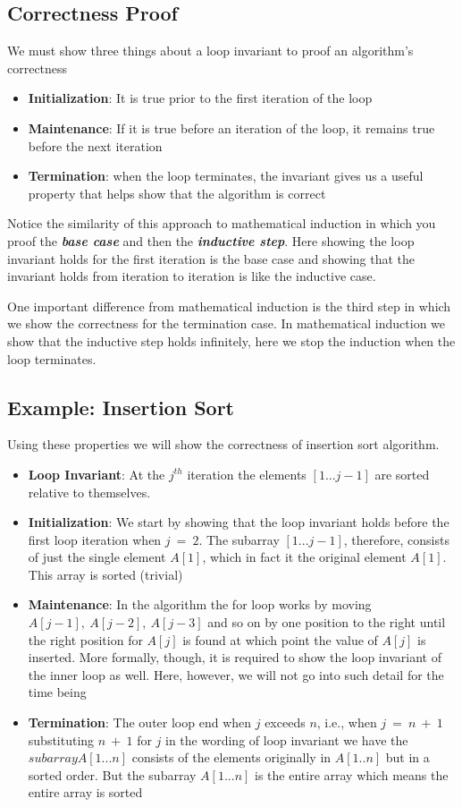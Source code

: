 \documentclass[12pt,a4paper]{book}
\begin{document}
\subsection{Correctness Proof}
We must show three things about a loop invariant to proof an algorithm’s correctness
\begin{itemize}
\item \textbf{Initialization}: It is true prior to the first iteration of the loop
\item \textbf{Maintenance}: If it is true before an iteration of the loop, it remains true before the next
iteration
\item \textbf{Termination}: when the loop terminates, the invariant gives us a useful property that
helps show that the algorithm is correct
\end{itemize}
\par Notice the similarity of this approach to mathematical induction in which you proof the \textit{\textbf{base case}} and then the \textbf{\textit{inductive step}}. Here showing the loop invariant holds for the first iteration is the base case and showing that the invariant holds from iteration to iteration is like the inductive case.
\par One important difference from mathematical induction is the third step in which we show the correctness for the termination case. In mathematical induction we show that the inductive step holds infinitely, here we stop the induction when the loop terminates.
\subsection{Example: Insertion Sort}

Using these properties we will show the correctness of insertion sort algorithm.
\begin{itemize}
\item \textbf{Loop Invariant}: At the $j^{th}$ iteration the elements $[1...j-1]$ are sorted relative to themselves.
\item \textbf{Initialization}: 
We start by showing that the loop invariant holds before the first loop iteration when $j\ =\ 2$. The subarray $[1 ... j-1]$, therefore, consists of just the single element $A[1]$, which in fact it the original element $A[1]$.  This array is sorted (trivial)
\item \textbf{Maintenance}:
In the algorithm the for loop works by moving $A[j-1],\ A[j-2],\ A[j-3]$ and so on by one position to the right until the right position for $A[j]$ is found at which point the value of $A[j]$ is inserted. More formally, though, it is required to show the loop invariant of the inner loop as well. Here, however, we will not go into such detail for the time being
\item \textbf{Termination}:
The outer loop end when $j$ exceeds $n$, i.e., when $j\ =\ n\ +\ 1$ substituting $n\ +\ 1$ for $j$ in the wording of loop invariant we have the $subarray A[1... n]$ consists of the elements originally in $A[1 .. n]$ but in a sorted order. But the subarray $A[1...n]$ is the entire array which means the entire array is sorted
\end{itemize}
\end{document}
